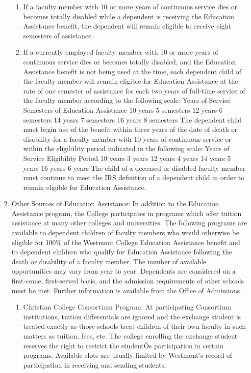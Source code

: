 \documentclass[letterpaper, 11pt]{article}
\begin{document}
\begin{enumerate}[label=\alph*)]
{\begin{enumerate}[label=\arabic*)]
							\item{If a faculty member with 10 or more years of continuous service dies or becomes totally disabled while a dependent is receiving the Education Assistance benefit, the dependent will remain eligible to receive eight semesters of assistance.}
							\item{If a currently employed faculty member with 10 or more years of continuous service dies or becomes totally disabled, and the Education Assistance benefit is not being used at the time, each dependent child of the faculty member will remain eligible for Education Assistance at the rate of one semester of assistance for each two years of full-time service of the faculty member according to the following scale:}
							Years of Service			Semesters of Education Assistance
							10 years				5 semesters
							12 years				6 semesters
							14 years				7 semesters
							16 years				8 semesters
							The dependent child must begin use of the benefit within three years of the date of death or disability for a faculty member with 10 years of continuous service or within the eligibility period indicated in the following scale:
							Years of Service			Eligibility Period
							10 years				3 years
							12 years				4 years
							14 years				5 years
							16 years				6 years
							The child of a deceased or disabled faculty member must continue to meet the IRS definition of a dependent child in order to remain eligible for Education Assistance.
						\end{enumerate}
					}
					\item{Other Sources of Education Assistance:
						In addition to the Education Assistance program, the College participates in programs which offer tuition assistance at many other colleges and universities.  The following programs are available to dependent children of faculty members who would otherwise be eligible for 100\% of the Westmont College Education Assistance benefit and to dependent children who qualify for Education Assistance following the death or disability of a faculty member.  The number of available opportunities may vary from year to year.  Dependents are considered on a first-come, first-served basis, and the admission requirements of other schools must be met. Further information is available from the Office of Admissions.
						\begin{enumerate}[label=\arabic*)]
							\item{Christian College Consortium Program:  At participating Consortium institutions, tuition differentials are ignored and the exchange student is treated exactly as those schools treat children of their own faculty in such matters as tuition, fees, etc.  The college enrolling the exchange student reserves the right to restrict the studentÕs participation in certain programs.  Available slots are usually limited by Westmont's record of participation in receiving and sending students.}

\end{enumerate}}
\end{enumerate}
\end{document}
